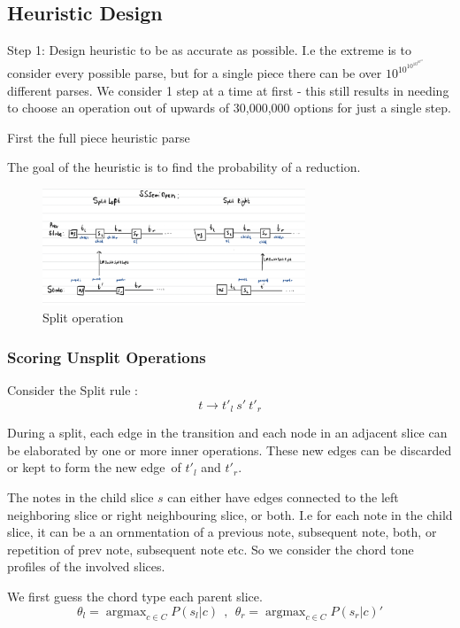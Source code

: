 \documentclass[12pt,a4paper,twoside,openright]{report}
\theoremstyle{definition}
\begin{document}
\subsection{Heuristic Design}
Step 1: Design heuristic to be as accurate as possible. I.e the extreme is to consider every possible parse, but for a single piece there can be over $10^{10^{10^{10^{10^{10}}}}}$ different parses. We consider 1 step at a time at first - this still results in needing to choose an operation out of upwards of 30,000,000 options for just a single step.     
\par
First the full piece heuristic parse 
\par
The goal of the heuristic is to find the probability of a reduction. 

\begin{figure}[ht]
  \centering
  \includegraphics[width=0.7\textwidth]{splitsssemiopen}
  \caption{Split operation}
  \label{fig:splitoperation}
\end{figure}

\FloatBarrier
\subsubsection{Scoring Unsplit Operations}
Consider the Split rule : \[t \to t'_{l}~s'~t'_{r}\]
\par
During a split, each edge in the transition and each node in an adjacent slice can be elaborated by one or more inner operations.
These new edges can be discarded or kept to form the new edge of $t'_l$ and $t'_r$.
\par 
The notes in the child slice $s$ can either have edges connected to the left neighboring slice or right neighbouring slice, or both. I.e for each note in the child slice, it can be a an ornmentation of a previous note, subsequent note, both, or repetition of prev note, subsequent note etc. So we consider the chord tone profiles of the involved slices. 

We first guess the chord type each parent slice. 
\[\theta_l = \mathop{argmax}_{c \in C} P(s_l|c) ~~,~~ \theta_r = \mathop{argmax}_{c \in C} P(s_r|c) '\]
\end{document}
